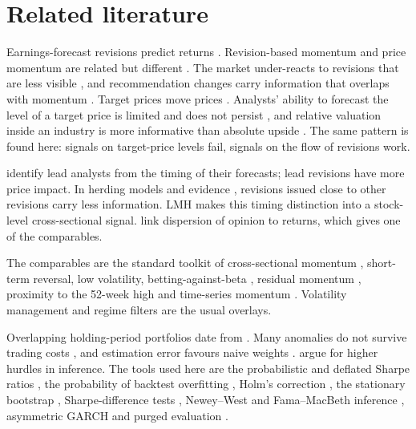 \section{Related literature}\label{sec:lit}

 Earnings-forecast revisions predict returns \citep{stickel1991}. Revision-based momentum and price momentum are related but different \citep{chan1996}. The market under-reacts to revisions that are less visible \citep{gleason2003}, and recommendation changes carry information that overlaps with momentum \citep{jegadeesh2004}. Target prices move prices \citep{brav2003,asquith2005}. Analysts' ability to forecast the level of a target price is limited and does not persist \citep{bradshaw2013}, and relative valuation inside an industry is more informative than absolute upside \citep{da2011}. The same pattern is found here: signals on target-price levels fail, signals on the flow of revisions work.

 \citet{cooper2001} identify lead analysts from the timing of their forecasts; lead revisions have more price impact. In herding models and evidence \citep{welch2000,hong2000,clement2005}, revisions issued close to other revisions carry less information. LMH makes this timing distinction into a stock-level cross-sectional signal. \citet{diether2002} link dispersion of opinion to returns, which gives one of the comparables.

 The comparables are the standard toolkit of cross-sectional momentum \citep{jegadeesh1993}, short-term reversal, low volatility, betting-against-beta \citep{frazzini2014}, residual momentum \citep{blitz2011}, proximity to the 52-week high \citep{george2004} and time-series momentum \citep{moskowitz2012}. Volatility management \citep{barroso2015,moreira2017} and regime filters \citep{hamilton1989} are the usual overlays.

 Overlapping holding-period portfolios date from \citet{jegadeesh1993}. Many anomalies do not survive trading costs \citep{novymarx2016}, and estimation error favours naive weights \citep{demiguel2009}. \citet{harvey2016} argue for higher hurdles in inference. The tools used here are the probabilistic and deflated Sharpe ratios \citep{bailey2012,bailey2014}, the probability of backtest overfitting \citep{bailey2017}, Holm's correction \citep{holm1979}, the stationary bootstrap \citep{politis1994}, Sharpe-difference tests \citep{jobson1981,memmel2003}, Newey--West and Fama--MacBeth inference \citep{newey1987,fama1973}, asymmetric GARCH \citep{glosten1993} and purged evaluation \citep{lopezdeprado2018}.

